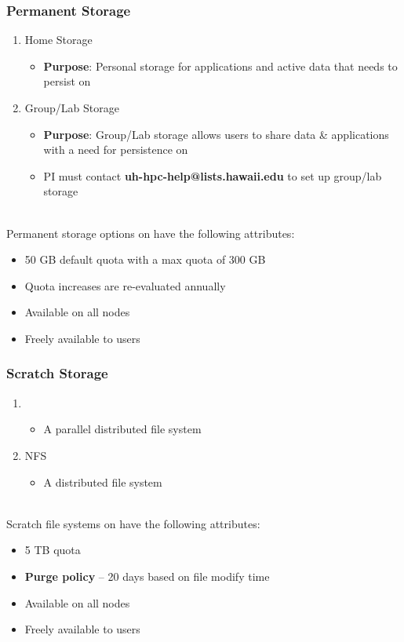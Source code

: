 \begin{frame}
  \frametitle{Permanent Storage}
  \begin{enumerate}
  \item Home Storage
    \begin{itemize}
    \item {\textbf{Purpose}}: Personal storage for applications and active data that needs to persist on {\mana}
    \end{itemize}
  \item Group/Lab Storage
    \begin{itemize}
    \item {\textbf{Purpose}}: Group/Lab storage allows users to share data \& applications with a need for persistence on {\mana}
    \item PI must contact \textbf{uh-hpc-help@lists.hawaii.edu} to set up group/lab storage
    \end{itemize}
  \end{enumerate}
~\\
  Permanent storage options on {\mana} have the following attributes:
  \begin{itemize}
  \item 50 GB default quota with a max quota of 300 GB
  \item Quota increases are re-evaluated annually
  \item Available on all nodes
  \item Freely available to users
  \end{itemize}

\end{frame}


\begin{frame}
  \frametitle{Scratch Storage}
  \begin{enumerate}
    \item {\lustre}
      \begin{itemize}
			\item A parallel distributed file system 
      \end{itemize}
    \item NFS
      \begin{itemize}
			\item A distributed file system 
      \end{itemize}
  \end{enumerate}
~\\
  Scratch file systems on {\mana} have the following attributes:
  \begin{itemize}
	\item 5 TB quota
  \item \textbf{Purge policy} -- 20 days based on file modify time
  \item Available on all nodes
  \item Freely available to users
  \end{itemize}

\end{frame}

